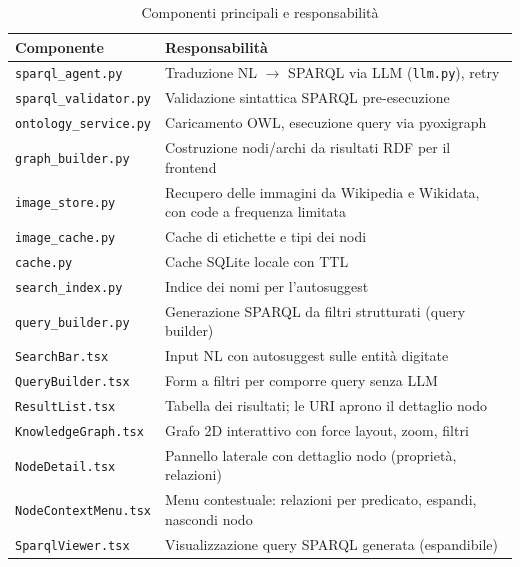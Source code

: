 \begin{table}[h]
\centering
\caption{Componenti principali e responsabilit\`a}
\label{tab:componenti}
\begin{tabularx}{\textwidth}{lX}
\toprule
\textbf{Componente}          & \textbf{Responsabilit\`a}                                        \\
\midrule
\texttt{sparql\_agent.py}    & Traduzione NL $\rightarrow$ SPARQL via LLM (\texttt{llm.py}), retry   \\
\texttt{sparql\_validator.py}& Validazione sintattica SPARQL pre-esecuzione                     \\
\texttt{ontology\_service.py}& Caricamento OWL, esecuzione query via pyoxigraph                 \\
\texttt{graph\_builder.py}   & Costruzione nodi/archi da risultati RDF per il frontend          \\
\texttt{image\_store.py}     & Recupero delle immagini da Wikipedia e Wikidata, con code a frequenza limitata \\
\texttt{image\_cache.py}     & Cache di etichette e tipi dei nodi                               \\
\texttt{cache.py}           & Cache SQLite locale con TTL                                      \\
\texttt{search\_index.py}    & Indice dei nomi per l'autosuggest                                \\
\texttt{query\_builder.py}   & Generazione SPARQL da filtri strutturati (query builder)         \\
\texttt{SearchBar.tsx}       & Input NL con autosuggest sulle entit\`a digitate                 \\
\texttt{QueryBuilder.tsx}    & Form a filtri per comporre query senza LLM                       \\
\texttt{ResultList.tsx}      & Tabella dei risultati; le URI aprono il dettaglio nodo           \\
\texttt{KnowledgeGraph.tsx}  & Grafo 2D interattivo con force layout, zoom, filtri              \\
\texttt{NodeDetail.tsx}      & Pannello laterale con dettaglio nodo (propriet\`a, relazioni)    \\
\texttt{NodeContextMenu.tsx} & Menu contestuale: relazioni per predicato, espandi, nascondi nodo \\
\texttt{SparqlViewer.tsx}    & Visualizzazione query SPARQL generata (espandibile)              \\
\bottomrule
\end{tabularx}
\end{table}

